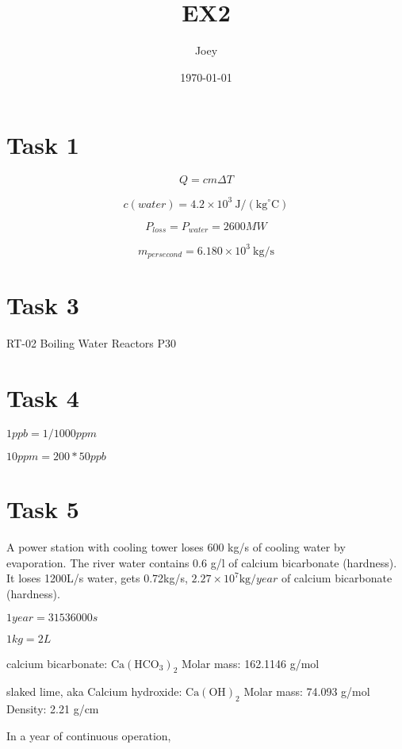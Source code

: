 \documentclass{article}
\title{EX2}
\author{Joey}
\date{\today}
\begin{document}
\maketitle

\section{Task 1}

\begin{equation}
    Q=c m \Delta T
\end{equation}

\begin{equation}
    c(water) = 4.2 \times 10^{3} \mathrm{~J} /\left(\mathrm{kg}^{\circ} \mathrm{C}\right)
\end{equation}

\begin{equation}
    P_{loss} = P_{water} = 2600MW
\end{equation}

\begin{equation}
    m_{per second} = 6.180 \times 10^{3} \mathrm{~kg} /\mathrm{s}
\end{equation}

\section{Task 3}

RT-02 Boiling Water Reactors P30

\section{Task 4}

$1ppb=1/1000ppm$

$10 ppm = 200 * 50 ppb$

\section{Task 5}

A power station with cooling tower loses 600 kg/s of cooling water by evaporation.
The river water contains 0.6 g/l of calcium bicarbonate (hardness).
It loses 1200L/s water, gets 0.72kg/s,  $2.27 \times 10^{7} \mathrm{kg} / year$ of calcium bicarbonate (hardness).

$1 year = 31536000 s$

$1 kg = 2 L$

calcium bicarbonate:
$\mathrm{Ca}\left(\mathrm{HCO}_{3}\right)_{2}$
Molar mass: 162.1146 g/mol

slaked lime, aka Calcium hydroxide:
$\mathrm{Ca}(\mathrm{OH})_{2}$
Molar mass: 74.093 g/mol
Density: 2.21 g/cm


In a year of continuous operation,
\end{document}
